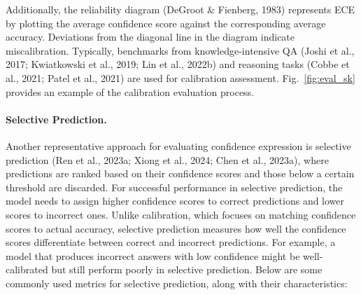 Additionally, the reliability diagram (DeGroot \& Fienberg, 1983) represents ECE by plotting the average confidence score against the corresponding average accuracy. Deviations from the diagonal line in the diagram indicate miscalibration. Typically, benchmarks from knowledge-intensive QA (Joshi et al., 2017; Kwiatkowski et al., 2019; Lin et al., 2022b) and reasoning tasks (Cobbe et al., 2021; Patel et al., 2021) are used for calibration assessment. Fig.~\ref{fig:eval_sk} provides an example of the calibration evaluation process.

\paragraph{Selective Prediction.} Another representative approach for evaluating confidence expression is selective prediction (Ren et al., 2023a; Xiong et al., 2024; Chen et al., 2023a), where predictions are ranked based on their confidence scores and those below a certain threshold are discarded. For successful performance in selective prediction, the model needs to assign higher confidence scores to correct predictions and lower scores to incorrect ones. Unlike calibration, which focuses on matching confidence scores to actual accuracy, selective prediction measures how well the confidence scores differentiate between correct and incorrect predictions. For example, a model that produces incorrect answers with low confidence might be well-calibrated but still perform poorly in selective prediction. Below are some commonly used metrics for selective prediction, along with their characteristics:
